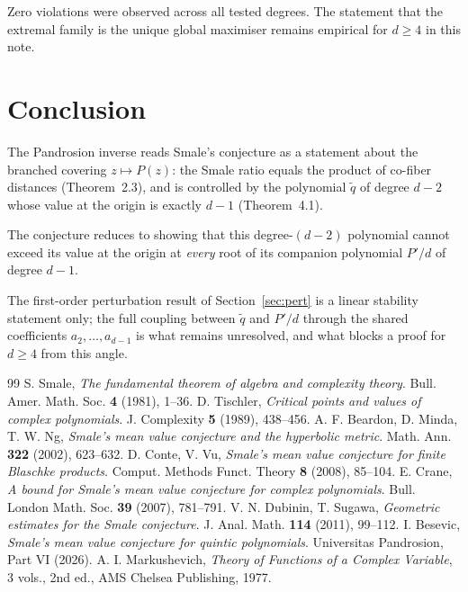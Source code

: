 \documentclass[11pt,a4paper]{article}
\begin{document}
Zero violations were observed across all tested degrees. The statement that the extremal family is the unique global maximiser remains empirical for $d \ge 4$ in this note.

\section{Conclusion}

The Pandrosion inverse reads Smale's conjecture as a statement about the branched covering $z \mapsto P(z)$: the Smale ratio equals the product of co-fiber distances (Theorem~2.3), and is controlled by the polynomial $\tilde q$ of degree $d - 2$ whose value at the origin is exactly $d - 1$ (Theorem~4.1).

The conjecture reduces to showing that this degree-$(d - 2)$ polynomial cannot exceed its value at the origin at \emph{every} root of its companion polynomial $P'/d$ of degree $d - 1$.

The first-order perturbation result of Section~\ref{sec:pert} is a linear stability statement only; the full coupling between $\tilde q$ and $P'/d$ through the shared coefficients $a_2, \dots, a_{d-1}$ is what remains unresolved, and what blocks a proof for $d \ge 4$ from this angle.

\begin{thebibliography}{99}
 S. Smale, \textit{The fundamental theorem of algebra and complexity theory}. Bull. Amer. Math. Soc. \textbf{4} (1981), 1--36.
 D. Tischler, \textit{Critical points and values of complex polynomials}. J. Complexity \textbf{5} (1989), 438--456.
 A. F. Beardon, D. Minda, T. W. Ng, \textit{Smale's mean value conjecture and the hyperbolic metric}. Math. Ann. \textbf{322} (2002), 623--632.
 D. Conte, V. Vu, \textit{Smale's mean value conjecture for finite Blaschke products}. Comput. Methods Funct. Theory \textbf{8} (2008), 85--104.
 E. Crane, \textit{A bound for Smale's mean value conjecture for complex polynomials}. Bull. London Math. Soc. \textbf{39} (2007), 781--791.
 V. N. Dubinin, T. Sugawa, \textit{Geometric estimates for the Smale conjecture}. J. Anal. Math. \textbf{114} (2011), 99--112.
 I. Besevic, \textit{Smale's mean value conjecture for quintic polynomials}. Universitas Pandrosion, Part VI (2026).
 A. I. Markushevich, \textit{Theory of Functions of a Complex Variable}, 3 vols., 2nd ed., AMS Chelsea Publishing, 1977.
\end{thebibliography}
\end{document}
